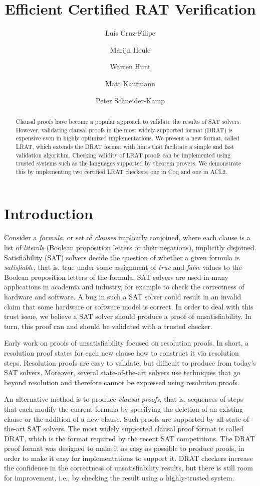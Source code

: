 \documentclass{article}
\author{Lu\'{i}s Cruz-Filipe \and Marijn Heule \and Warren Hunt \and Matt Kaufmann \and Peter Schneider-Kamp}
\title{Efficient Certified RAT Verification}
\begin{document}
\maketitle

\begin{abstract}
Clausal proofs have become a popular approach to validate the results
of SAT solvers. However, validating clausal proofs in the most widely
supported format (DRAT) is expensive even in highly optimized
implementations.  We present a new format, called LRAT, which extends
the DRAT format with hints that facilitate a simple and fast
validation algorithm.  Checking validity of LRAT proofs can be
implemented using trusted systems such as the languages supported by
theorem provers.  We demonstrate this by implementing two certified
LRAT checkers, one in Coq and one in ACL2.
\end{abstract}

\section{Introduction}

Consider a {\em formula}, or set of {\em clauses} implicitly
conjoined, where each clause is a list of {\em literals} (Boolean
proposition letters or their negations), implicitly disjoined.
Satisfiability (SAT) solvers decide the question of whether a given
formula is {\em satisfiable}, that is, true under some assignment of
{\em true} and {\em false} values to the Boolean proposition letters
of the formula.  SAT solvers are used in many applications in academia
and industry, for example to check the correctness of hardware and
software.  
%
%
A bug in such a SAT solver could result in an invalid claim that some
hardware or software model is correct.  In order to deal with this
trust issue, we believe a SAT solver should produce a proof of
unsatisfiability. In turn, this proof can and should be validated with
a trusted checker.

Early work on proofs of unsatisfiability focused on resolution
proofs. In short, a resolution proof states for each new clause how to
construct it via resolution steps. Resolution proofs are easy to
validate, but difficult to produce from today's SAT solvers. Moreover,
several state-of-the-art solvers use techniques that go beyond
resolution and therefore cannot be expressed using resolution proofs.

An alternative method is to produce {\em clausal proofs}, that is,
sequences of steps that each modify the current formula by specifying
the deletion of an existing clause or the addition of a new clause.
Such proofs are
supported by all state-of-the-art SAT solvers.  The most widely
supported clausal proof format is called DRAT, which is the format
required by the recent SAT competitions.  The DRAT proof format was
designed to make it as easy as possible to produce proofs, in order
to make it easy for implementations to support it.  DRAT checkers
increase the confidence in the correctness of unsatisfiability
results, but there is still room for improvement, i.e., by checking
the result using a highly-trusted system.
\end{document}
